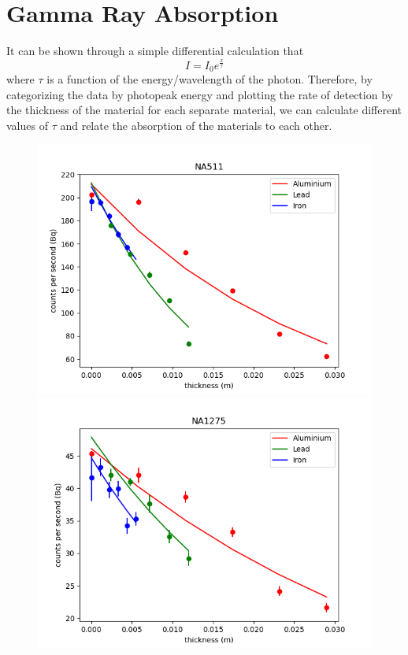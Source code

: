 \documentclass[12pt, a4paper]{article}
\begin{document}
\section{Gamma Ray Absorption}
	It can be shown through a simple differential calculation that
	\begin{equation}
		I = I_0 e^{\frac{x}{\tau}}
	\end{equation}
	where $\tau$ is a function of the energy/wavelength of the photon. Therefore, by categorizing the data by photopeak energy and plotting the rate of detection by the thickness of the material for each separate material, we can calculate different values of $\tau$ and relate the absorption of the materials to each other.
	\begin{figure}[H] \centering
		\includegraphics[scale=0.4]{assets/NA511.png}
		\includegraphics[scale=0.4]{assets/NA1275.png}

\end{figure}
\end{document}
